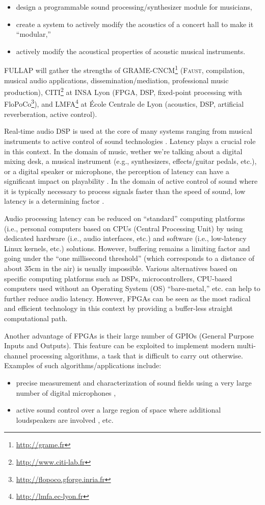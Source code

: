 \documentclass[a4paper,10pt]{article}
\newcommand{\F}{\textsc{Faust}}
\newcommand{\PP}{FULLAP}
\begin{document}
\begin{itemize}
  \itemsep0em
  \item design a programmable sound processing/synthesizer module for musicians, 
  \item create a system to actively modify the acoustics of a concert hall to make it ``modular,''
  \item actively modify the acoustical properties of acoustic musical instruments. 
\end{itemize}
\PP{} will gather the strengths of GRAME-CNCM\footnote{\url{http://grame.fr}} (\F{}, compilation, musical audio applications, dissemination/mediation, professional music production), CITI\footnote{\url{http://www.citi-lab.fr}} at INSA Lyon (FPGA, DSP, fixed-point processing with FloPoCo\footnote{\url{http://flopoco.gforge.inria.fr}}), and LMFA\footnote{\url{http://lmfa.ec-lyon.fr}} at École Centrale de Lyon (acoustics, DSP, artificial reverberation, active control).

Real-time audio DSP is used at the core of many systems ranging from musical instruments to active control of sound technologies \cite{nelson1991activea}. Latency plays a crucial role in this context.  In the domain of music, wether we're talking about a digital mixing desk, a musical instrument (e.g., synthesizers, effects/guitar pedals, etc.), or a digital speaker or microphone, the perception of latency can have a significant impact on playability \cite{Lago2004}. In the domain of active control of sound where it is typically necessary to process signals faster than the speed of sound, low latency is a determining factor \cite{elliott2000signal}.

Audio processing latency can be reduced on ``standard'' computing platforms (i.e., personal computers based on CPUs (Central Processing Unit) by using dedicated hardware (i.e., audio interfaces, etc.) and software (i.e., low-latency Linux kernels, etc.) solutions. However, buffering remains a limiting factor and going under the ``one millisecond threshold'' (which corresponds to a distance of about 35cm in the air) is usually impossible. Various alternatives based on specific computing platforms such as DSPs, microcontrollers, CPU-based computers used without an Operating System (OS) ``bare-metal,'' etc. can help to further reduce audio latency. However, FPGAs can be seen as the most radical and efficient technology in this context by providing a buffer-less straight computational path.

Another advantage of FPGAs is their large number of GPIOs (General Purpose Inputs and Outputs). This feature can be exploited to implement modern multi-channel processing algorithms, a task that is difficult to carry out otherwise. Examples of such algorithms/applications include: 
\begin{itemize}
	\itemsep0em
	\item precise measurement and characterization of sound fields using a very large number of digital microphones \cite{salze2019new}, 
	\item active sound control over a large region of space where additional loudspeakers are involved \cite{Zhang2018}, etc.
\end{itemize}
\end{document}
